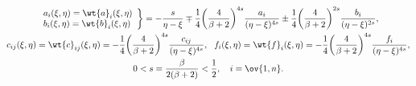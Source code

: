 \begin{gather*}


\left. \begin{array}{l}


a_i(\xi,\eta)=\wt{a}_i (\xi,\eta)\\


b_i(\xi,\eta)=\wt{b}_i (\xi,\eta)


\end{array}


\right\}


=- \frac{s}{\eta - \xi} \mp \frac{1}{4} \bigg(


\frac{4}{\beta +2} \bigg)^{4s}\frac{a_{i}}{(\eta - \xi)^{4s}} \pm


\frac{1}{4} \bigg(\frac{4}{\beta


+2} \bigg)^{2s}\frac{b_{i}}{(\eta - \xi)^{2s}},\\


%


c_{ij}(\xi,\eta) = \wt{c}_{ij}(\xi,\eta) = -\frac{1}{4}\bigg(\frac{4}{\beta


+2}\bigg)^{4s}\frac{c_{ij}}{(\eta - \xi)^{4s}},\ \ 


f_{i}(\xi,\eta) = \wt{f}_{i}(\xi,\eta) = -\frac{1}{4} \bigg(


\frac{4}{\beta +2} \bigg)^{4s}\frac{f_{i}}{(\eta -\xi)^{4s}},\\


%


0<s=\frac{\beta}{2(\beta+2)}<\frac{1}{2},\quad i=\ov {1,n}.


\end{gather*}


















\hskip 7.5cm


